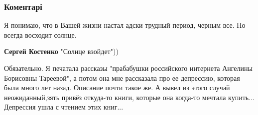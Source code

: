  
 
 
 
 
\subsubsection{Коментарі}
\label{sec:06_08_2021.fb.bilchenko_evgenia.1.svoboda_cena.cmt}

\begin{itemize}
 
Я понимаю, что в Вашей жизни настал адски трудный период, черным все. Но всегда
восходит солнце.

\begin{itemize}
 
\textbf{Сергей Костенко} "Солнце взойдет"))

 

Обязательно. Я печатала рассказы "прабабушки российского интернета Ангелины
Борисовны Тареевой", а потом она мне рассказала про ее депрессию, которая была
много лет назад. Описание почти такое же. А вывел из этого случай
неожиданный,зять привёз откуда-то книги, которые она когда-то мечтала купить...
Депрессия ушла с чтением этих книг...


 

\end{itemize}
\end{itemize}

